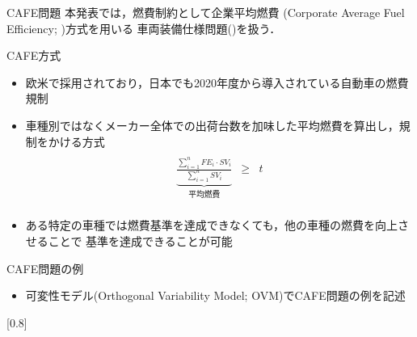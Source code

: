 \documentclass[dvipdfmx, 11pt]{beamer}
\begin{document}
\begin{frame}{CAFE問題}
本発表では，燃費制約として企業平均燃費
(Corporate Average Fuel Efficiency; )方式を用いる
車両装備仕様問題()を扱う．
 \begin{block}{CAFE方式}
  \begin{itemize}
   \item 欧米で採用されており，日本でも2020年度から導入されている自動車の燃費規制
   \item 車種別ではなくメーカー全体での出荷台数を加味した平均燃費を算出し，規制をかける方式
	 \[
	 \begin{array}{lcr}
	  & & \\
	  \underbrace{
	   \displaystyle\frac{\sum_{i=1}^{n} FE_{i}\cdot SV_{i}}
	   {\sum_{i=1}^{n} SV_{i}}}_{\mbox{平均燃費}
	   }
	   &
	   \geq 
	   &
	   t \\
	 \end{array}
	 \]

  \end{itemize} 
 \end{block}
\begin{itemize}
 \item ある特定の車種では燃費基準を達成できなくても，他の車種の燃費を向上させることで
       基準を達成できることが可能
\end{itemize}
\end{frame}
\begin{frame}{CAFE問題の例}
 \begin{itemize}
  \item 可変性モデル(Orthogonal Variability Model; OVM)でCAFE問題の例を記述
 \end{itemize}
 \scalebox{0.8}[0.8]{%
  
 }
\end{frame}
\end{document}
